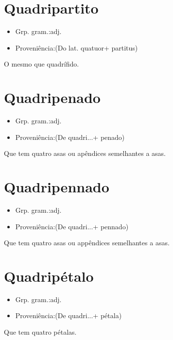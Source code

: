 \section{Quadripartito}
\begin{itemize}
\item {Grp. gram.:adj.}
\end{itemize}
\begin{itemize}
\item {Proveniência:(Do lat. \textunderscore quatuor\textunderscore  + \textunderscore partitus\textunderscore )}
\end{itemize}
O mesmo que \textunderscore quadrífido\textunderscore .
\section{Quadripenado}
\begin{itemize}
\item {Grp. gram.:adj.}
\end{itemize}
\begin{itemize}
\item {Proveniência:(De \textunderscore quadri...\textunderscore  + \textunderscore penado\textunderscore )}
\end{itemize}
Que tem quatro asas ou apêndices semelhantes a asas.
\section{Quadripennado}
\begin{itemize}
\item {Grp. gram.:adj.}
\end{itemize}
\begin{itemize}
\item {Proveniência:(De \textunderscore quadri...\textunderscore  + \textunderscore pennado\textunderscore )}
\end{itemize}
Que tem quatro asas ou appêndices semelhantes a asas.
\section{Quadripétalo}
\begin{itemize}
\item {Grp. gram.:adj.}
\end{itemize}
\begin{itemize}
\item {Proveniência:(De \textunderscore quadri...\textunderscore  + \textunderscore pétala\textunderscore )}
\end{itemize}
Que tem quatro pétalas.
